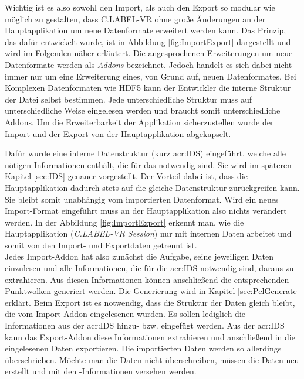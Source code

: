 Wichtig ist es also sowohl den Import, als auch den Export so modular wie möglich zu gestalten, dass C.LABEL-VR ohne große Änderungen  an der Hauptapplikation um neue Datenformate erweitert werden kann. Das Prinzip, das dafür entwickelt wurde, ist in Abbildung \ref{fig:ImportExport} dargestellt und wird im Folgenden näher erläutert. Die angesprochenen Erweiterungen um neue Datenformate werden als \textit{Addons} bezeichnet. Jedoch handelt es sich dabei nicht immer nur um eine Erweiterung eines, von Grund auf, neuen Datenformates. 
Bei Komplexen Datenformaten wie HDF5 kann der Entwickler die interne Struktur der Datei selbst bestimmen. Jede unterschiedliche Struktur muss auf unterschiedliche Weise eingelesen werden und braucht somit unterschiedliche Addons. Um die Erweiterbarkeit der Applikation sicherzustellen wurde der Import und der Export von der Hauptapplikation abgekapselt.

Dafür wurde eine interne Datenstruktur (kurz \acrshort{acr:IDS}) eingeführt, welche alle nötigen Informationen enthält, die für das  notwendig sind. Sie wird im späteren Kapitel \ref{sec:IDS} genauer vorgestellt. Der Vorteil dabei ist, dass die Hauptapplikation dadurch stets auf die gleiche Datenstruktur zurückgreifen kann. Sie bleibt somit unabhängig vom importierten Datenformat. Wird ein neues Import-Format eingeführt muss an der Hauptapplikation also nichts verändert werden. In der Abbildung \ref{fig:ImportExport} erkennt man, wie die Hauptapplikation (\textit{C.LABEL-VR Session}) nur mit internen Daten arbeitet und somit von den Import- und Exportdaten getrennt ist.\\ 

Jedes Import-Addon hat also zunächst die Aufgabe, seine jeweiligen Daten einzulesen und alle Informationen, die für die \acrshort{acr:IDS} notwendig sind, daraus zu extrahieren. Aus diesen Informationen können anschließend die entsprechenden Punktwolken generiert werden. Die Generierung wird in Kapitel \ref{sec:PclGenerate} erklärt. Beim Export ist es notwendig, dass die Struktur der Daten gleich bleibt, die vom Import-Addon eingelesenen wurden. Es sollen lediglich die -Informationen aus der \acrshort{acr:IDS} hinzu- bzw. eingefügt werden. Aus der \acrshort{acr:IDS} kann das Export-Addon diese Informationen extrahieren und anschließend in die eingelesenen Daten exportieren. Die importierten Daten werden so allerdings überschrieben. Möchte man die Daten nicht überschreiben, müssen die Daten neu erstellt und mit den -Informationen versehen werden. \\

